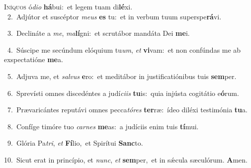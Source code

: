 \lettrine{\initial\textcolor{\initialcolor}{I}}{níquos} ó\-\textit{di}\-\textit{o} \textbf{há}\-bui:~\star et legem tuam di\-\textbf{lé}\-xi.\\
{\numbfont\textcolor{\numbcolor}{~2.}}~Adjútor et suscéptor \textit{me}\-\textit{us} \textbf{es} tu:~\star et in verbum tuum superspe\-\textbf{rá}\-vi.\par
{\numbfont\textcolor{\numbcolor}{~3.}}~Declináte a \textit{me}\-, \textit{ma}\-\textbf{lí}gni:~\star et scrutábor mandáta Dei \textbf{me}\-i.\par
{\numbfont\textcolor{\numbcolor}{~4.}}~Súscipe me secúndum elóquium tu\-\textit{um}\-, \textit{et} \textbf{vi}\-vam:~\star et non confúndas me ab exspectatióne \textbf{me}\-a.\par
{\numbfont\textcolor{\numbcolor}{~5.}}~Adjuva me, et \textit{sal}\-\textit{vus} \textbf{e}\-ro:~\star et meditábor in justificatiónibus tuis \textbf{sem}\-per.\par
{\numbfont\textcolor{\numbcolor}{~6.}}~Sprevísti omnes discedéntes a judí\-\textit{ci}\-\textit{is} \textbf{tu}\-is:~\star quia injústa cogitátio e\-\textbf{ó}\-rum.\par
{\numbfont\textcolor{\numbcolor}{~7.}}~Prævaricántes reputávi omnes pecca\-\textit{tó}\-\textit{res} \textbf{ter}\-ræ:~\star ídeo diléxi testimónia \textbf{tu}\-a.\par
{\numbfont\textcolor{\numbcolor}{~8.}}~Confíge timóre tuo \textit{car}\-\textit{nes} \textbf{me}\-as:~\star a judíciis enim tuis \textbf{tí}\-mui.\par
{\numbfont\textcolor{\numbcolor}{~9.}}~Glória Pa\-\textit{tri}\-, \textit{et} \textbf{Fí}\-lio,~\star et Spirítui \textbf{Sanc}\-to.\par
{\numbfont\textcolor{\numbcolor}{10.}}~Sicut erat in princípio, et \textit{nunc}\-, \textit{et} \textbf{sem}\-per,~\star et in sǽcula sæculórum. \textbf{A}\-men.\par
